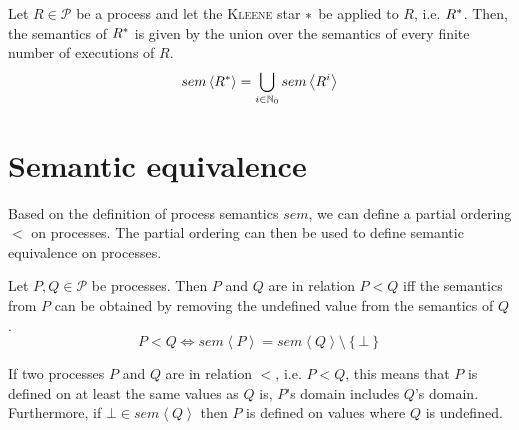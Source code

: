 

\begin{definition}
\label{def:sem_kleene_alternative}
  Let $R \in \mathcal{P}$ be a process and let the \textsc{Kleene} star $*$ be applied to $R$, i.e. $R^*$. Then, the semantics of $R^*$ is given by the union over the semantics of every finite number of executions of $R$.
  \begin{equation}
    \label{eqn:sem_kleene_alternative}
    sem \left\langle R^* \right\rangle = \bigcup_{i \in \mathbb{N}_0} sem \left\langle R^i \right\rangle
  \end{equation}
  \hfill\qedsymbol
\end{definition}


\section{Semantic equivalence}
Based on the definition of process semantics $sem$, we can define a partial ordering $<$ on processes. The partial ordering can then be used to define semantic equivalence on processes.



\begin{definition}
\label{def:process_ordering}
Let $P, Q \in \mathcal{P}$ be processes. Then $P$ and $Q$ are in relation $P < Q$ iff the semantics from $P$ can be obtained by removing the undefined value from the semantics of $Q$.
  \begin{equation}
    P < Q \Leftrightarrow sem \left\langle P \right\rangle = sem \left\langle Q \right\rangle \setminus \left\{ \bot \right\}
  \end{equation}
  \hfill\qedsymbol
\end{definition}



If two processes $P$ and $Q$ are in relation $<$, i.e. $P < Q$, this means that $P$ is defined on at least the same values as $Q$ is, $P$'s domain includes $Q$'s domain. Furthermore, if $\bot \in sem \left\langle Q \right\rangle$ then $P$ is defined on values where $Q$ is undefined.

